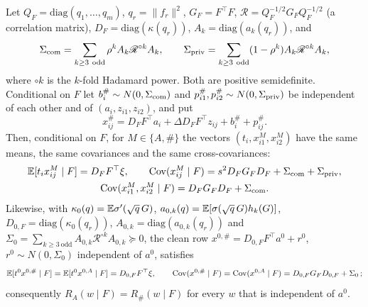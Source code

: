 \begin{proposition}\label{prop:gaussianization}
Let $Q_F=\mathrm{diag}(q_1,\dots,q_m)$, $q_r=\|f_r\|^2$, $G_F=F^\top F$, $\mathscr R=Q_F^{-1/2}G_FQ_F^{-1/2}$ (a
correlation matrix), $D_F=\mathrm{diag}(\kappa(q_r))$, $A_k=\mathrm{diag}(a_k(q_r))$, and
\[
\Sigma_{\rm com}=\sum_{k\ge3\ \mathrm{odd}}\rho^kA_k\mathscr R^{\circ k}A_k,\qquad
\Sigma_{\rm priv}=\sum_{k\ge3\ \mathrm{odd}}(1-\rho^k)A_k\mathscr R^{\circ k}A_k,
\]
where $\circ k$ is the $k$-fold Hadamard power. Both are positive semidefinite. Conditional on $F$ let
$b_i^\#\sim N(0,\Sigma_{\rm com})$ and $p_{i1}^\#,p_{i2}^\#\sim N(0,\Sigma_{\rm priv})$ be independent of each other
and of $(a_i,z_{i1},z_{i2})$, and put
\begin{equation}
x^\#_{ij}=D_FF^\top a_i+\Delta D_FF^\top z_{ij}+b_i^\#+p^\#_{ij}.
\label{eq:sharp}
\end{equation}
Then, conditional on $F$, for $M\in\{A,\#\}$ the vectors $(t_i,x^M_{i1},x^M_{i2})$ have the same means, the same
covariances and the same cross-covariances:
\begin{equation}
\begin{gathered}
\mathbb{E}[t_ix^M_{ij}\mid F]=D_FF^\top\xi,\qquad
\mathrm{Cov}(x^M_{ij}\mid F)=s^2D_FG_FD_F+\Sigma_{\rm com}+\Sigma_{\rm priv},\\
\mathrm{Cov}(x^M_{i1},x^M_{i2}\mid F)=D_FG_FD_F+\Sigma_{\rm com}.
\end{gathered}
\label{eq:matching}
\end{equation}
Likewise, with $\kappa_0(q)=\mathbb{E}\sigma'(\sqrt q\,G)$, $a_{0,k}(q)=\mathbb{E}[\sigma(\sqrt q\,G)h_k(G)]$,
$D_{0,F}=\mathrm{diag}(\kappa_0(q_r))$, $A_{0,k}=\mathrm{diag}(a_{0,k}(q_r))$ and
$\Sigma_{0}=\sum_{k\ge3\ \mathrm{odd}}A_{0,k}\mathscr R^{\circ k}A_{0,k}\succeq0$, the clean row
$x^{0,\#}=D_{0,F}F^\top a^0+r^0$, $r^0\sim N(0,\Sigma_0)$ independent of $a^0$, satisfies
\[
\mathbb{E}[t^0x^{0,\#}\mid F]=\mathbb{E}[t^0x^{0,A}\mid F]=D_{0,F}F^\top\xi,\qquad
\mathrm{Cov}(x^{0,\#}\mid F)=\mathrm{Cov}(x^{0,A}\mid F)=D_{0,F}G_FD_{0,F}+\Sigma_0\,;
\]
consequently $R_A(w\mid F)=R_\#(w\mid F)$ for every $w$ that is independent of $a^0$.
\end{proposition}

